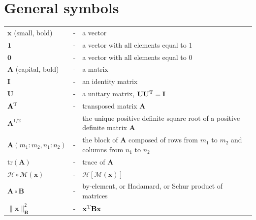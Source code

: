 \documentclass[11pt]{report}
\newcommand{\mb} {\mathbf}
\newcommand{\T}{^{\tiny \mathrm T}}
\begin{document}
\section*{General symbols}
\begin{tabular}{lll}
  $\mb x$ (small, bold) &-& a vector \\
  $\mb 1$ &-& a vector with all elements equal to 1 \\
  $\mb 0$ &-& a vector with all elements equal to 0 \\
  $\mb A$ (capital, bold) &-& a matrix \\
  $\mb I$ &-& an identity matrix \\
  $\mb U$ &-& a unitary matrix, $\mb U \mb U\T = \mb I$ \\
  $\mb A\T$ &-& transposed matrix $\mb A$ \\
  $\mb A^{1/2}$ &-& the unique positive definite square root of a positive definite matrix $\mb A$ \\
  $\mb A(m_1 : m_2, n_1 : n_2)$ &-& the block of $\mb A$ composed of rows from $m_1$ to $m_2$ and columns from $n_1$ to $n_2$\\
  $\mathrm{tr}(\mb A)$ &-& trace of $\mb A$ \\
  $\mathcal H \circ \mathcal M(\mb x)$ &-& $\mathcal H \left[ \mathcal M (\mb x) \right]$ \\
  $\mb A \circ \mb B$ &-& by-element, or Hadamard, or Schur product of matrices\\
  $\|\mb x\|^2_{\mb B }$ &-& $ \mb x\T \mb B \mb x$
  \end{tabular}
\end{document}
